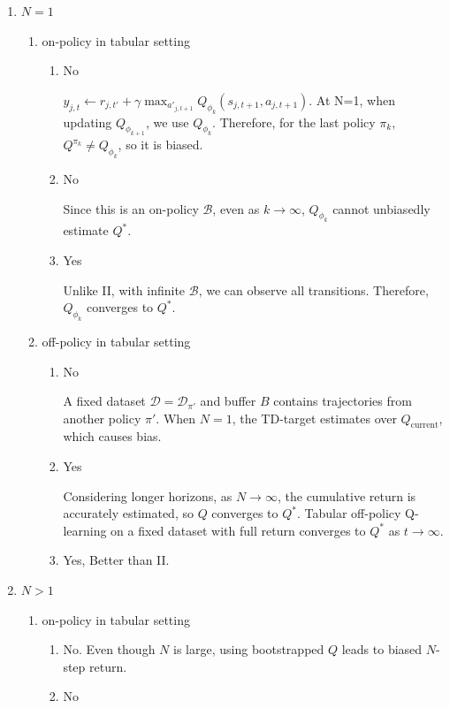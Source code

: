 \documentclass{article}
\begin{document}
\begin{tcolorbox}[answerbox, parbox=false]
  \begin{enumerate}
    \item $N=1$
    \begin{enumerate}
      \item on-policy in tabular setting
      \begin{enumerate}[label=\Roman*.]
        \item No
         
         $y_{j,t} \leftarrow r_{j,t'} + \gamma \max_{{a'}_{j, t+1}} Q_{\phi_k}(s_{j,t+1}, a_{j,t+1})$. At N=1, when updating $Q_{\phi_{k+1}}$, we use $Q_{\phi_k}$. Therefore, for the last policy $\pi_k$, $Q^{\pi_k} \neq Q_{\phi_{k}}$, so it is biased.
         \item No
         
         Since this is an on-policy $\mathcal{B}$, even as $k\rightarrow \infty$, $Q_{\phi_{k}}$ cannot unbiasedly estimate $Q^{*}$.
         \item Yes
         
         Unlike II, with infinite $\mathcal{B}$, we can observe all transitions. Therefore, $Q_{\phi_{k}}$ converges to $Q^{*}$.
      \end{enumerate}
      \item off-policy in tabular setting
      \begin{enumerate}
        \item No
        
        A fixed dataset $\mathcal{D} = \mathcal{D}_{\pi'}$ and buffer $B$ contains trajectories from another policy $\pi'$. When $N = 1$, the TD-target estimates over $Q_{\text{current}}$, which causes bias.
        \item Yes
        
        Considering longer horizons, as $N \rightarrow \infty$, the cumulative return is accurately estimated, so $Q$ converges to $Q^*$. Tabular off-policy Q-learning on a fixed dataset with full return converges to $Q^*$ as $t \rightarrow \infty$.
        \item Yes, Better than II.
      \end{enumerate}
    \end{enumerate}
    \item $N>1$
    \begin{enumerate}
      \item on-policy in tabular setting
      \begin{enumerate}[label=\Roman*.]
        \item No. Even though $N$ is large, using bootstrapped $Q$ leads to biased $N$-step return.
        \item No
        

\end{enumerate}
\end{enumerate}
\end{enumerate}
\end{tcolorbox}
\end{document}
